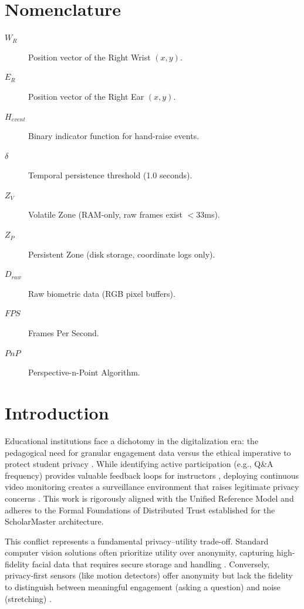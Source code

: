 \documentclass[conference]{IEEEtran}
\begin{document}
\section*{Nomenclature}
\begin{description}
    \item[$W_R$] Position vector of the Right Wrist $(x, y)$.
    \item[$E_R$] Position vector of the Right Ear $(x, y)$.
    \item[$H_{event}$] Binary indicator function for hand-raise events.
    \item[$\delta$] Temporal persistence threshold (1.0 seconds).
    \item[$Z_V$] Volatile Zone (RAM-only, raw frames exist $<$33ms).
    \item[$Z_P$] Persistent Zone (disk storage, coordinate logs only).
    \item[$D_{raw}$] Raw biometric data (RGB pixel buffers).
    \item[$FPS$] Frames Per Second.
    \item[$PnP$] Perspective-n-Point Algorithm.
\end{description}

\section{Introduction}
Educational institutions face a dichotomy in the digitalization era: the pedagogical need for granular engagement data versus the ethical imperative to protect student privacy \cite{b1}. While identifying active participation (e.g., Q\&A frequency) provides valuable feedback loops for instructors \cite{b18}, deploying continuous video monitoring creates a surveillance environment that raises legitimate privacy concerns \cite{b2, b17}. This work is rigorously aligned with the Unified Reference Model \cite{P20} and adheres to the Formal Foundations of Distributed Trust \cite{P21} established for the ScholarMaster architecture.

This conflict represents a fundamental privacy--utility trade-off. Standard computer vision solutions often prioritize utility over anonymity, capturing high-fidelity facial data that requires secure storage and handling \cite{b4}. Conversely, privacy-first sensors (like motion detectors) offer anonymity but lack the fidelity to distinguish between meaningful engagement (asking a question) and noise (stretching) \cite{b5}.
\end{document}
